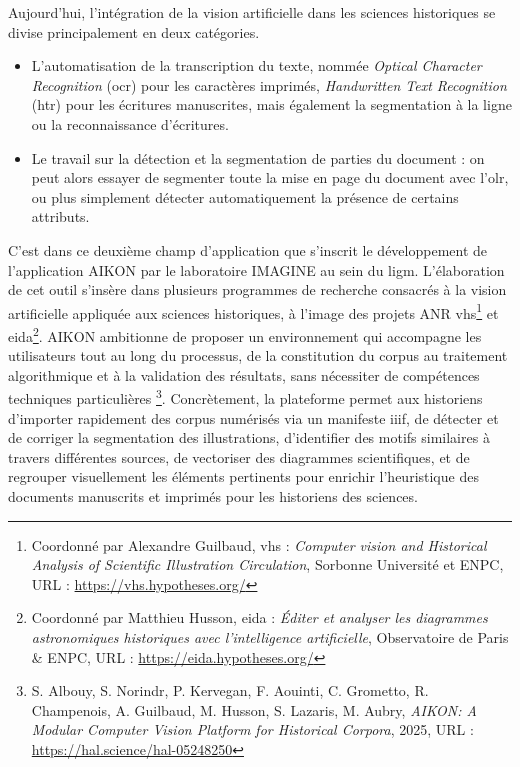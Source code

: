 Aujourd'hui, l'intégration de la vision artificielle dans les sciences historiques se divise principalement en deux catégories.
\begin{itemize}
    \item L'automatisation de la transcription du texte, nommée \textit{Optical Character Recognition} (\gls{ocr}) pour les caractères imprimés, \textit{Handwritten Text Recognition} (\gls{htr}) pour les écritures manuscrites, mais également la segmentation à la ligne ou la reconnaissance d'écritures.
    \item Le travail sur la détection et la segmentation de parties du document : on peut alors essayer de segmenter toute la mise en page du document avec l'\gls{olr}, ou plus simplement détecter automatiquement la présence de certains attributs.
\end{itemize}

C'est dans ce deuxième champ d'application que s'inscrit le développement de l'application AIKON par le laboratoire IMAGINE au sein du \gls{ligm}. L'élaboration de cet outil s'insère dans plusieurs programmes de recherche consacrés à la vision artificielle appliquée aux sciences historiques, à l'image des projets ANR \gls{vhs}\footnote{Coordonné par Alexandre Guilbaud, \gls{vhs} : \textit{Computer vision and Historical Analysis of Scientific Illustration Circulation}, Sorbonne Université et ENPC, URL :  \href{https://vhs.hypotheses.org/}{https://vhs.hypotheses.org/}} et \gls{eida}\footnote{Coordonné par Matthieu Husson, \gls{eida} : \textit{Éditer et analyser les diagrammes astronomiques historiques avec l’intelligence artificielle},  Observatoire de Paris \& ENPC, URL : \href{https://eida.hypotheses.org/}{https://eida.hypotheses.org/}}.
AIKON ambitionne de proposer un environnement qui \og accompagne les utilisateurs tout au long du processus, de la constitution du corpus au traitement algorithmique et à la validation des résultats, sans nécessiter de compétences techniques particulières \fg\footnote{S. Albouy, S. Norindr, P. Kervegan, F. Aouinti, C. Grometto, R. Champenois, A. Guilbaud, M. Husson, S. Lazaris, M. Aubry, \textit{AIKON: A Modular Computer Vision Platform for Historical Corpora}, 2025, URL :  \href{https://hal.science/hal-05248250}{https://hal.science/hal-05248250}}. Concrètement, la plateforme permet aux historiens d'importer rapidement des corpus numérisés via un manifeste \gls{iiif}, de détecter et de corriger la segmentation des illustrations, d'identifier des motifs similaires à travers différentes sources, de vectoriser des diagrammes scientifiques, et de regrouper visuellement les éléments pertinents pour enrichir l'heuristique des documents manuscrits et imprimés pour les historiens des sciences.

